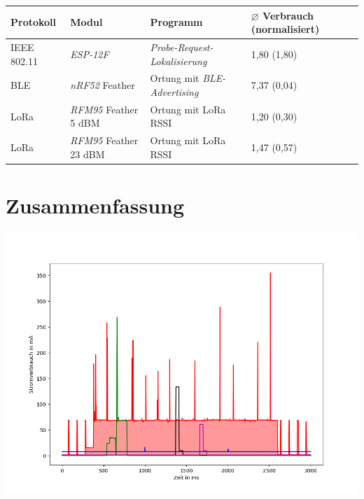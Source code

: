 \documentclass[18pt]{beamer}
\begin{document}
\begin{frame}
	\begin{tabular}{l|p{3cm}|p{3cm}|R{2.1cm}}
		Protokoll & Modul & Programm  & $\varnothing$ Verbrauch (normalisiert)\\
		\hline
		IEEE 802.11 & \emph{ESP-12F} & \emph{Probe-Request-Lokalisierung} & 1,80 (1,80)\\
		\hline
		BLE & \emph{nRF52} Feather & Ortung mit \emph{BLE-Advertising} & 7,37 (0,04)\\
		\hline
		LoRa & \emph{RFM95} Feather 5 dBM & Ortung mit LoRa RSSI & 1,20 (0,30)\\
		LoRa & \emph{RFM95} Feather 23 dBM & Ortung mit LoRa RSSI & 1,47 (0,57)\\
	\end{tabular}
\end{frame}

\section{Zusammenfassung}
\begin{frame}
	\begin{minipage}[c][\textheight][c]{\textwidth}
		\centering
		\includegraphics[height=0.95\textheight]{plots/alle.png}
	\end{minipage}
\end{frame}
\end{document}
